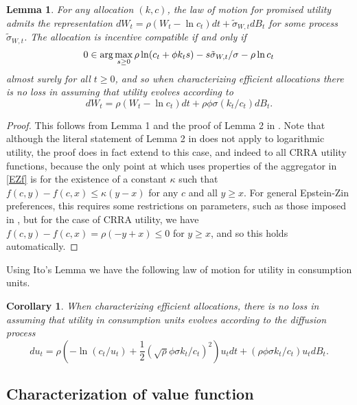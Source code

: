 \documentclass[11pt]{article}
\theoremstyle{plain}
\newtheorem{lemma}[thm]{Lemma}
\newtheorem{corl}[thm]{Corollary}
\theoremstyle{definition} %
\begin{document}
\begin{lemma} \label{ICchar} 
For any allocation $(k,c)$, the law of motion for promised utility admits the representation $dW_t = \rho{\left(W_t - \ln c_t\right)}dt + \tilde{\sigma}_{W,t} dB_t$ for some process $\tilde{\sigma}_{W,t}$. The allocation is incentive compatible if and only if 
\begin{equation}
0 \in \textnormal{arg} \max_{s\geq 0} \rho \ln(c_t + \phi k_t s) - s \tilde{\sigma}_{W,t} /\sigma - \rho \ln c_t
\label{localIC}
\end{equation}
almost surely for all $t\geq0$, and so when characterizing efficient allocations there is no loss in assuming that utility evolves according to
\begin{equation}
dW_t = \rho{\left(W_t - \ln c_t\right)}dt + \rho \phi \sigma (k_t/c_t) dB_t.
\label{IC_rep}
\end{equation}
\end{lemma}

\begin{proof}
This follows from Lemma 1 and the proof of Lemma 2 in \cite{di_tella_optimal_2019}. Note that although the literal statement of Lemma 2 in \cite{di_tella_optimal_2019} does not apply to logarithmic utility, the proof does in fact extend to this case, and indeed to all CRRA utility functions, because the only point at which \cite{di_tella_optimal_2019} uses properties of the aggregator in \eqref{EZf} is for the existence of a constant $\kappa$ such that $f(c,y) - f(c,x) \leq \kappa(y - x)$ for any $c$ and all $y \geq x$. For general Epstein-Zin preferences, this requires some restrictions on parameters, such as those imposed in \cite{di_tella_optimal_2019}, but for the case of CRRA utility, we have $f(c, y) - f(c, x) = \rho(-y+x) \leq 0$ for $y \geq x$, and so this holds automatically.
\end{proof}

Using Ito's Lemma we have the following law of motion for utility in consumption units. 

\begin{corl} \label{corl_IC}
When characterizing efficient allocations, there is no loss in assuming that utility in consumption units evolves according to the diffusion process
$$
du_t = \rho{\left( -\ln(c_t/u_t) + \frac{1}{2}(\sqrt{\rho} \phi  \sigma k_t/c_t)^2\right)}u_tdt + (\rho \phi \sigma k_t/c_t)u_tdB_t. 
$$
\end{corl}

\subsection{Characterization of value function}
\end{document}
